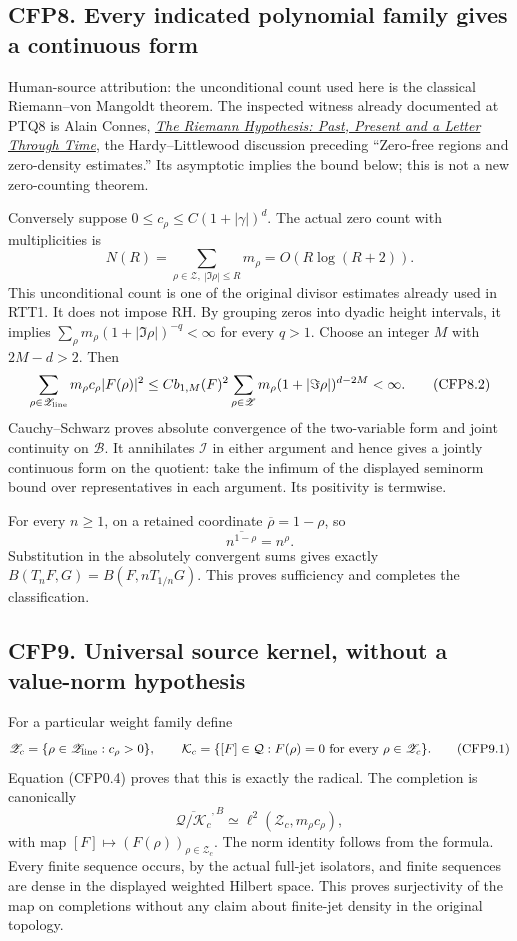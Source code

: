 \subsection{CFP8. Every indicated polynomial family gives a continuous
form}\label{cfp8.-every-indicated-polynomial-family-gives-a-continuous-form}

Human-source attribution: the unconditional count used here is the classical Riemann--von Mangoldt theorem. The inspected witness already documented at PTQ8 is Alain Connes, \href{https://arxiv.org/abs/2602.04022v1}{\emph{The Riemann Hypothesis: Past, Present and a Letter Through Time}}, the Hardy--Littlewood discussion preceding ``Zero-free regions and zero-density estimates.'' Its asymptotic implies the bound below; this is not a new zero-counting theorem.

Conversely suppose \(0\le c_\rho\le C(1+|\gamma|)^d\). The actual zero
count with multiplicities is \[
N(R)=\sum_{\rho\in\mathscr Z,\ |\Im\rho|\le R}m_\rho
=O(R\log(R+2)).
\tag{CFP8.1}
\] This unconditional count is one of the original divisor estimates
already used in RTT1. It does not impose RH. By grouping zeros into
dyadic height intervals, it implies
\(\sum_\rho m_\rho(1+|\Im\rho|)^{-q}<\infty\) for every \(q>1\). Choose
an integer \(M\) with \(2M-d>2\). Then \[
\sum_{\rho\in\mathscr Z_{\rm line}}
m_\rho c_\rho |F(\rho)|^2
\le C b_{1,M}(F)^2
\sum_{\rho\in\mathscr Z}m_\rho(1+|\Im\rho|)^{d-2M}<\infty.
\tag{CFP8.2}
\] Cauchy--Schwarz proves absolute convergence of the two-variable form
and joint continuity on \(\mathcal B\). It annihilates \(\mathcal I\) in
either argument and hence gives a jointly continuous form on the
quotient: take the infimum of the displayed seminorm bound over
representatives in each argument. Its positivity is termwise.

For every \(n\ge1\), on a retained coordinate \(\overline\rho=1-\rho\),
so \[
\overline{n^{1-\rho}}=n^\rho.
\] Substitution in the absolutely convergent sums gives exactly
\(B(T_nF,G)=B(F,nT_{1/n}G)\). This proves sufficiency and completes the
classification.

\subsection{CFP9. Universal source kernel, without a value-norm
hypothesis}\label{cfp9.-universal-source-kernel-without-a-value-norm-hypothesis}

For a particular weight family define \[
\mathscr Z_c=\{\rho\in\mathscr Z_{\rm line}:c_\rho>0\},
\qquad
\mathcal K_c=\{[F]\in\mathcal Q:F(\rho)=0\text{ for every }\rho\in\mathscr Z_c\}.
\tag{CFP9.1}
\] Equation (CFP0.4) proves that this is exactly the radical. The
completion is canonically \[
\overline{\mathcal Q/\mathcal K_c}^{,B}
\simeq\ell^2(\mathscr Z_c,m_\rho c_\rho),
\tag{CFP9.2}
\] with map \([F]\mapsto(F(\rho))_{\rho\in\mathscr Z_c}\). The norm
identity follows from the formula. Every finite sequence occurs, by the
actual full-jet isolators, and finite sequences are dense in the
displayed weighted Hilbert space. This proves surjectivity of the map on
completions without any claim about finite-jet density in the original
topology.


